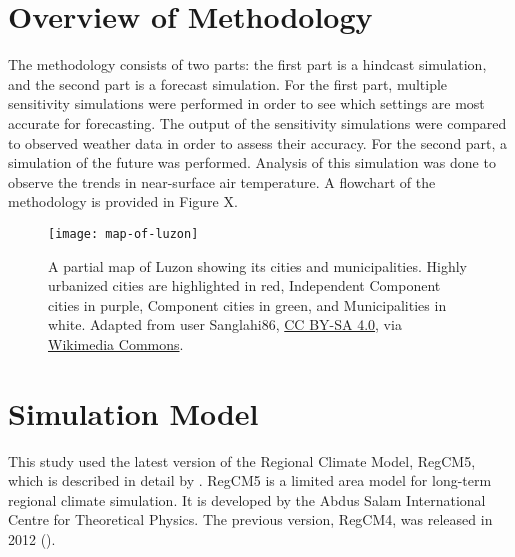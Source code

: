 
\section{Overview of Methodology}
	The methodology consists of two parts:
		the first part is a hindcast simulation,
		and the second part is a forecast simulation.
	For the first part, multiple sensitivity simulations were performed in order to see which settings are most accurate for forecasting.
	The output of the sensitivity simulations were compared to observed weather data in order to assess their accuracy.
	For the second part, a simulation of the future was performed. Analysis of this simulation was done to observe the trends in near-surface air temperature.
	A flowchart of the methodology is provided in Figure X.

	
	\begin{figure}
		\centering
		\texttt{[image: map-of-luzon]}
		\caption{
			A partial map of Luzon showing its cities and municipalities.
			Highly urbanized cities are highlighted in red,
				Independent Component cities in purple,
				Component cities in green, and
				Municipalities in white.
			Adapted from user Sanglahi86, 	
				\href{https://creativecommons.org/licenses/by-sa/4.0}{CC BY-SA 4.0},
				via \href{https://commons.wikimedia.org/wiki/File:Cities_and_municipalities_of_the_Philippines.png}{Wikimedia Commons}.
		}
		\label{fig:map-of-metro-manila}
	\end{figure}	
		
\section{Simulation Model}
	This study used the latest version of the Regional Climate Model, RegCM5, which is described in detail by \textcite{Giorgi2023}.
	RegCM5 is a limited area model for long-term regional climate simulation.
	It is developed by the Abdus Salam International Centre for Theoretical Physics.
	The previous version, RegCM4, was released in 2012 (\cite{Giorgi2012}).
	

